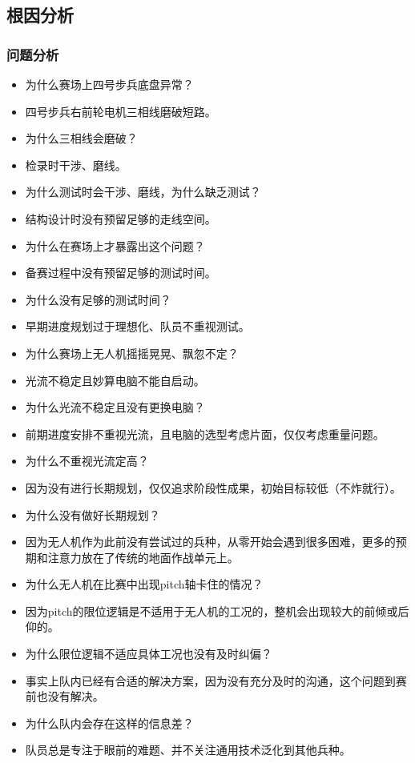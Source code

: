 \subsection{根因分析}

    \subsubsection{问题分析}


        \begin{itemize}
            \item 为什么赛场上四号步兵底盘异常？
            \item 四号步兵右前轮电机三相线磨破短路。
            \item 为什么三相线会磨破？
            \item 检录时干涉、磨线。
            \item 为什么测试时会干涉、磨线，为什么缺乏测试？
            \item 结构设计时没有预留足够的走线空间。
            \item 为什么在赛场上才暴露出这个问题？
            \item 备赛过程中没有预留足够的测试时间。
            \item 为什么没有足够的测试时间？
            \item 早期进度规划过于理想化、队员不重视测试。\\
            
            \item 为什么赛场上无人机摇摇晃晃、飘忽不定？
            \item 光流不稳定且妙算电脑不能自启动。
            \item 为什么光流不稳定且没有更换电脑？
            \item 前期进度安排不重视光流，且电脑的选型考虑片面，仅仅考虑重量问题。
            \item 为什么不重视光流定高？
            \item 因为没有进行长期规划，仅仅追求阶段性成果，初始目标较低（不炸就行）。
            \item 为什么没有做好长期规划？
            \item 因为无人机作为此前没有尝试过的兵种，从零开始会遇到很多困难，更多的预期和注意力放在了传统的地面作战单元上。\\
            
            \item 为什么无人机在比赛中出现pitch轴卡住的情况？
            \item 因为pitch的限位逻辑是不适用于无人机的工况的，整机会出现较大的前倾或后仰的。
            \item 为什么限位逻辑不适应具体工况也没有及时纠偏？
            \item 事实上队内已经有合适的解决方案，因为没有充分及时的沟通，这个问题到赛前也没有解决。
            \item 为什么队内会存在这样的信息差？
            \item 队员总是专注于眼前的难题、并不关注通用技术泛化到其他兵种。\\
            

\end{itemize}
